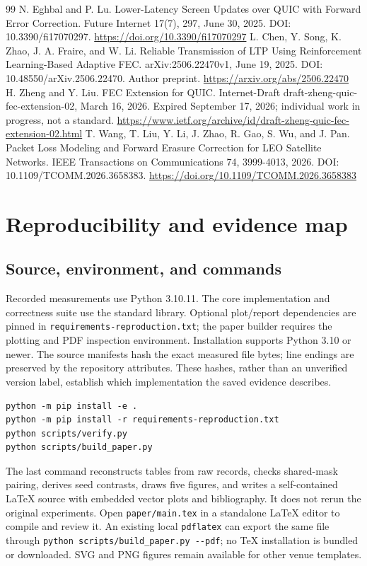 \documentclass[11pt,a4paper]{article}
\begin{document}
\begin{thebibliography}{99}
 N. Eghbal and P. Lu. Lower-Latency Screen Updates over QUIC with Forward Error Correction. Future Internet 17(7), 297, June 30, 2025. DOI: 10.3390/fi17070297. \url{https://doi.org/10.3390/fi17070297}
 L. Chen, Y. Song, K. Zhao, J. A. Fraire, and W. Li. Reliable Transmission of LTP Using Reinforcement Learning-Based Adaptive FEC. arXiv:2506.22470v1, June 19, 2025. DOI: 10.48550/arXiv.2506.22470. Author preprint. \url{https://arxiv.org/abs/2506.22470}
 H. Zheng and Y. Liu. FEC Extension for QUIC. Internet-Draft draft-zheng-quic-fec-extension-02, March 16, 2026. Expired September 17, 2026; individual work in progress, not a standard. \url{https://www.ietf.org/archive/id/draft-zheng-quic-fec-extension-02.html}
 T. Wang, T. Liu, Y. Li, J. Zhao, R. Gao, S. Wu, and J. Pan. Packet Loss Modeling and Forward Erasure Correction for LEO Satellite Networks. IEEE Transactions on Communications 74, 3999-4013, 2026. DOI: 10.1109/TCOMM.2026.3658383. \url{https://doi.org/10.1109/TCOMM.2026.3658383}
\end{thebibliography}
\clearpage\appendix
\section{Reproducibility and evidence map}
\subsection{Source, environment, and commands}
Recorded measurements use Python 3.10.11. The core implementation and correctness suite use the standard library. Optional plot/report dependencies are pinned in \texttt{requirements-\allowbreak{}reproduction.txt}; the paper builder requires the plotting and PDF inspection environment. Installation supports Python 3.10 or newer. The source manifests hash the exact measured file bytes; line endings are preserved by the repository attributes. These hashes, rather than an unverified version label, establish which implementation the saved evidence describes.

\begin{verbatim}
python -m pip install -e .
python -m pip install -r requirements-reproduction.txt
python scripts/verify.py
python scripts/build_paper.py
\end{verbatim}
The last command reconstructs tables from raw records, checks shared-mask pairing, derives seed contrasts, draws five figures, and writes a self-contained LaTeX source with embedded vector plots and bibliography. It does not rerun the original experiments. Open \texttt{paper/\allowbreak{}main.tex} in a standalone LaTeX editor to compile and review it. An existing local \texttt{pdflatex} can export the same file through \texttt{python scripts/\allowbreak{}build\_\allowbreak{}paper.py -\allowbreak{}-\allowbreak{}pdf}; no TeX installation is bundled or downloaded. SVG and PNG figures remain available for other venue templates.
\end{document}

